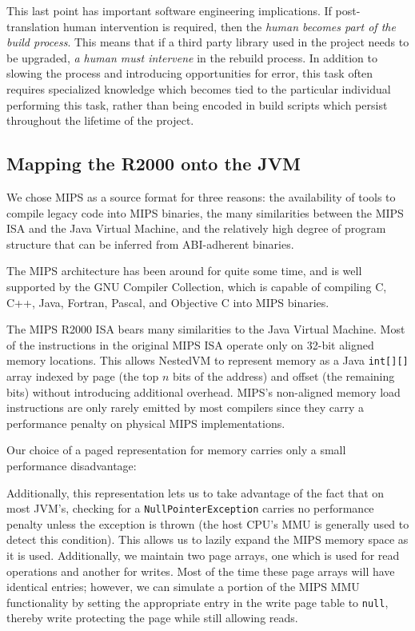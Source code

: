 \documentclass{acmconf}
\begin{document}
This last point has important software engineering implications.
If post-translation human intervention is required, then the {\it
human becomes part of the build process}.  This means that if a third
party library used in the project needs to be upgraded, {\it a human
must intervene} in the rebuild process.  In addition to slowing the
process and introducing opportunities for error, this task often
requires specialized knowledge which becomes tied to the particular
individual performing this task, rather than being encoded in build
scripts which persist throughout the lifetime of the project.

\subsection{Mapping the R2000 onto the JVM}

We chose MIPS as a source format for three reasons: the availability
of tools to compile legacy code into MIPS binaries, the many
similarities between the MIPS ISA and the Java Virtual Machine, and
the relatively high degree of program structure that can be inferred
from ABI-adherent binaries.

The MIPS architecture has been around for quite some time, and is well
supported by the GNU Compiler Collection, which is capable of
compiling C, C++, Java, Fortran, Pascal, and Objective C
into MIPS binaries.

The MIPS R2000 ISA bears many similarities to the Java Virtual
Machine.  Most of the instructions in the original MIPS ISA operate
only on 32-bit aligned memory locations. This allows NestedVM to
represent memory as a Java {\tt int[][]} array indexed by page (the
top $n$ bits of the address) and offset (the remaining bits) without
introducing additional overhead.  MIPS's non-aligned memory load
instructions are only rarely emitted by most compilers since they
carry a performance penalty on physical MIPS implementations.

Our choice of a paged representation for memory carries only a small
performance disadvantage:


Additionally, this representation lets us to take advantage of the
fact that on most JVM's, checking for a {\tt NullPointerException}
carries no performance penalty unless the exception is thrown (the
host CPU's MMU is generally used to detect this condition).  This
allows us to lazily expand the MIPS memory space as it is used.
Additionally, we maintain two page arrays, one which is used for read
operations and another for writes.  Most of the time these page arrays
will have identical entries; however, we can simulate a portion of the
MIPS MMU functionality by setting the appropriate entry in the write
page table to {\tt null}, thereby write protecting the page while
still allowing reads.
\end{document}
